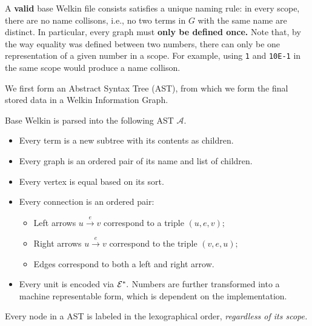 \begin{definition}
A \textbf{valid} base Welkin file consists satisfies a unique naming rule: in every scope, there are no name collisons, i.e., no two terms in $G$ with the same name are distinct. %
In particular, every graph must \textbf{only be defined once.} Note that, by the way equality was defined between two numbers,
there can only be one representation of a given number in a scope. For example, using \texttt{1} and \texttt{10E-1} in the same scope would produce a name collison.
\end{definition}
We first form an Abstract Syntax Tree (AST), from which we form the final stored data in a Welkin Information Graph.
\begin{definition}
  Base Welkin is parsed into the following AST $\mathcal{A}.$
  \begin{itemize}
	\item Every term is a new subtree with its contents as children.
  \item Every graph is an ordered pair of its name and list of children.
  \item Every vertex is equal based on its sort.
    \item Every connection is an ordered pair:
		  \begin{itemize}
			\item Left arrows $u \xrightarrow{e} v$ correspond to a triple $(u, e, v);$
			\item Right arrows $u \xrightarrow{e} v$ correspond to the triple $(v, e, u);$
			\item Edges correspond to both a left and right arrow.
		  \end{itemize}
	\item Every unit is encoded via $\mathcal{E}^{*}.$ Numbers are further transformed into a machine representable form, which is dependent on the implementation.
  \end{itemize}
\end{definition}
\label{def:unit-graph}


Every node in a AST is labeled in the lexographical order, \textit{regardless of its scope.}

